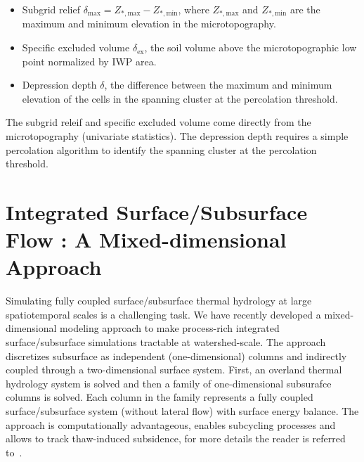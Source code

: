 \documentclass[review,11pt]{elsarticle}
\begin{document}
\begin{itemize}
\item Subgrid relief $\delta_\text{max} = Z_{*,\text{max}} -   Z_{*,\text{min}}$, where  $Z_{*,\text{max}}$ and  $Z_{*,\text{min}}$ are the maximum and minimum elevation in the microtopography. 
\item Specific excluded volume $\delta_\text{ex}$, the soil volume above the microtopographic low point normalized by IWP area.
\item Depression depth $\delta$, the difference between the maximum and minimum elevation of the cells in the spanning cluster at the percolation threshold.
\end{itemize}
The subgrid releif and specific excluded volume come directly from the microtopography (univariate statistics). The depression depth requires a simple percolation algorithm to identify the spanning cluster at the percolation threshold. 

\section{Integrated Surface/Subsurface Flow : A Mixed-dimensional Approach}
Simulating fully coupled surface/subsurface thermal hydrology at large spatiotemporal scales is a challenging task. We have recently developed a mixed-dimensional modeling approach to make process-rich integrated surface/subsurface simulations tractable at watershed-scale. The approach discretizes subsurface as independent (one-dimensional) columns and indirectly coupled through a two-dimensional surface system. First, an overland thermal hydrology system is solved and then a family of one-dimensional subsurafce columns is solved. Each column in the family represents a fully coupled surface/subsurface system (without lateral flow) with surface energy balance. The approach is computationally advantageous, enables subcycling processes and allows to track thaw-induced subsidence, for more details the reader is referred to~\cite{jan2017}.
\end{document}
